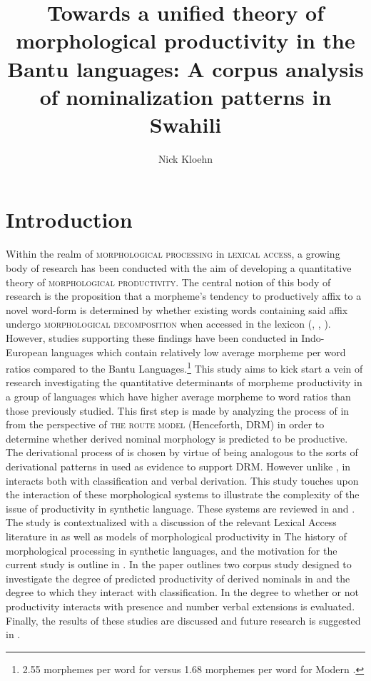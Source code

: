 \documentclass[output=paper,modfonts]{langscibook}
\title{Towards a unified theory of morphological productivity in the Bantu languages: A corpus analysis of nominalization patterns in Swahili}
\author{Nick Kloehn\affiliation{University of Arizona} 
}
\begin{document}
\maketitle
    


\section{Introduction}\label{sec:kloehn:1}


Within the realm of \textsc{morphological processing} in \textsc{lexical access}, a growing body of research has been conducted with the aim of developing a quantitative theory of \textsc{morphological productivity}. The central notion of this body of research is the proposition that a morpheme’s tendency to productively affix to a novel word-form is determined by whether existing words containing said affix undergo \textsc{morphological decomposition} when accessed in the lexicon (\citealt{Bybee1995}, \citealt{Hay2002}, \citealt{HayBaayen2002}). However, studies supporting these findings have been conducted in Indo-European languages which contain relatively low average morpheme per word ratios compared to the Bantu Languages.{}\footnote{2.55 morphemes per word for  versus 1.68 morphemes per word for Modern  \citep{Greenberg1959}.} This study aims to kick start a vein of research investigating the quantitative determinants of morpheme productivity in a group of languages which have higher average morpheme to word ratios than those previously studied. This first step is made by analyzing the process of  in  from the perspective of \textsc{the  route model} \citep{Baayen1992} (Henceforth, DRM) in order to determine whether derived nominal morphology is predicted to be productive. The derivational process of  is chosen by virtue of being analogous to the sorts of derivational patterns in  used as evidence to support DRM. However unlike ,  in  interacts both with  classification and verbal derivation. This study touches upon the interaction of these morphological systems to illustrate the complexity of the issue of productivity in synthetic language. These systems are reviewed in  and . The study is contextualized with a discussion of the relevant Lexical Access literature in  as well as models of morphological productivity in  The history of morphological processing in synthetic languages, and the motivation for the current study is outline in . In  the paper outlines two corpus study designed to investigate the degree of predicted productivity of derived nominals in  and the degree to which they interact with  classification. In  the degree to whether or not productivity interacts with presence and number verbal extensions is evaluated. Finally, the results of these studies are discussed and future research is suggested in .
\end{document}
